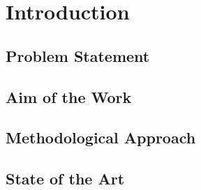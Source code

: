 \documentclass[draft,final]{vutinfth} %
\begin{document}
\frontmatter %


\AddStatementPage


\begin{acknowledgements*}
\end{acknowledgements*}


\begin{abstract}
\end{abstract}


\tableofcontents %

\mainmatter

\chapter{Introduction}
\section{Problem Statement}
\section{Aim of the Work}
\section{Methodological Approach}
\section{State of the Art}
\end{document}

